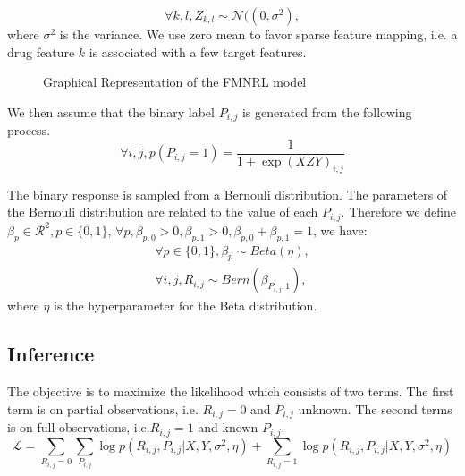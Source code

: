 \documentclass[sigconf,anonymous]{acmart}
\begin{document}
\begin{equation}\label{equ:z}
\forall k,l, Z_{k,l}\sim \mathcal{N}((0,\sigma^2), 
\end{equation}
where $\sigma^2$ is the variance. We use zero mean to favor sparse feature mapping, i.e. a drug feature $k$ is associated with a few target features. 

\begin{figure}\label{fig:model}
  \centering
\caption{Graphical Representation of the FMNRL model}
\end{figure}

We then assume that the binary label $P_{i,j}$ is generated from the following process. 
\begin{equation}\label{equ:p}
\forall i,j, p(P_{i,j}=1)=\frac{1}{1+\exp{(XZY)}_{i,j}}
\end{equation} 

The binary response is sampled from a Bernouli distribution. The parameters of the Bernouli distribution are related to the value of each $P_{i,j}$. Therefore we define $\beta_p\in\mathcal{R}^{2},p\in \{0,1\}$, $\forall p, \beta_{p,0}>0,\beta_{p,1}>0,\beta_{p,0}+\beta_{p,1}=1$, we have: 
\begin{eqnarray}
\forall p\in \{0,1\}, \beta_p \sim Beta(\eta),\\
\forall i,j, R_{i,j} \sim Bern (\beta_{P_{i,j},1}),
\end{eqnarray}
where $\eta$ is the hyperparameter for the Beta distribution. 

\subsection{Inference}\label{sec:inference}
The objective is to maximize the likelihood which consists of two terms. The first term is on partial observations, i.e. $R_{i,j}=0$ and $P_{i,j}$ unknown. The second terms is on full observations, i.e.$R_{i,j}=1$ and known $P_{i,j}$.
\begin{equation}\label{equ:loss}
\mathcal{L}=\sum_{R_{i,j}=0}\sum_{P_{i,j}} \log p(R_{i,j},P_{i,j}|X,Y,\sigma^2,\eta) + \sum_{R_{i,j}=1} \log p(R_{i,j},P_{i,j}|X,Y,\sigma^2,\eta) 
\end{equation}
\end{document}
